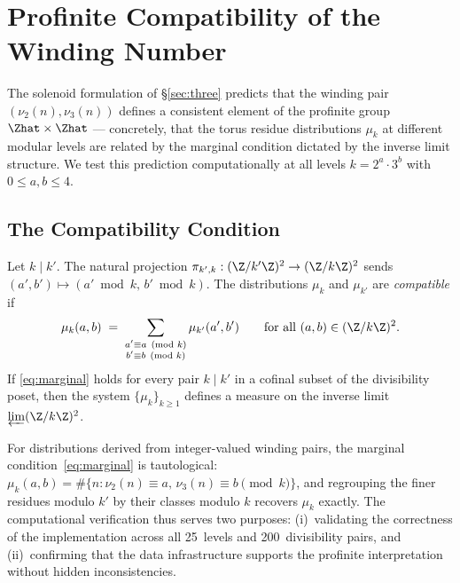 \section{Profinite Compatibility of the Winding Number}\label{sec:profinite-compat}

The solenoid formulation of \S\ref{sec:three} predicts that the winding pair
$(\nu_2(n), \nu_3(n))$ defines a consistent element of the profinite group
$\Zhat \times \Zhat$ --- concretely, that the torus residue distributions
$\mu_k$ at different modular levels are related by the marginal condition
dictated by the inverse limit structure.  We test this prediction
computationally at all levels $k = 2^a \cdot 3^b$ with $0 \leq a, b \leq 4$.


\subsection{The Compatibility Condition}

\begin{definition}\label{def:marginal}
    Let $k \mid k'$.  The natural projection $\pi_{k',k}: (\Z/k'\Z)^2 \to
    (\Z/k\Z)^2$ sends $(a', b') \mapsto (a' \bmod k, \, b' \bmod k)$.
    The distributions $\mu_k$ and $\mu_{k'}$ are \emph{compatible} if
    \begin{equation}\label{eq:marginal}
        \mu_k(a, b) \;=\; \sum_{\substack{a' \equiv a \pmod{k} \\
        b' \equiv b \pmod{k}}} \mu_{k'}(a', b')
        \qquad \text{for all } (a, b) \in (\Z/k\Z)^2.
    \end{equation}
    If \eqref{eq:marginal} holds for every pair $k \mid k'$ in a cofinal
    subset of the divisibility poset, then the system
    $\{\mu_k\}_{k \geq 1}$ defines a measure on the inverse limit
    $\varprojlim (\Z/k\Z)^2$.
\end{definition}

\begin{remark}
    For distributions derived from integer-valued winding pairs, the
    marginal condition~\eqref{eq:marginal} is tautological:
    $\mu_k(a,b) = \#\{n : \nu_2(n) \equiv a, \, \nu_3(n) \equiv b
    \pmod{k}\}$, and regrouping the finer residues modulo $k'$ by their
    classes modulo $k$ recovers $\mu_k$ exactly.  The computational
    verification thus serves two purposes: (i)~validating the correctness
    of the implementation across all 25~levels and 200~divisibility pairs,
    and (ii)~confirming that the data infrastructure supports the
    profinite interpretation without hidden inconsistencies.
\end{remark}


